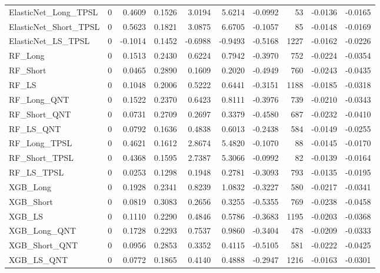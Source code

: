 \begin{tabular}{llrrrrrrrr}
\cline{1-10}
ElasticNet\_Long\_TPSL & 0 & 0.4609 & 0.1526 & 3.0194 & 5.6214 & -0.0992 & 53 & -0.0136 & -0.0165 \\
\cline{1-10}
ElasticNet\_Short\_TPSL & 0 & 0.5623 & 0.1821 & 3.0875 & 6.6705 & -0.1057 & 85 & -0.0148 & -0.0169 \\
\cline{1-10}
ElasticNet\_LS\_TPSL & 0 & -0.1014 & 0.1452 & -0.6988 & -0.9493 & -0.5168 & 1227 & -0.0162 & -0.0226 \\
\cline{1-10}
RF\_Long & 0 & 0.1513 & 0.2430 & 0.6224 & 0.7942 & -0.3970 & 752 & -0.0224 & -0.0354 \\
\cline{1-10}
RF\_Short & 0 & 0.0465 & 0.2890 & 0.1609 & 0.2020 & -0.4949 & 760 & -0.0243 & -0.0435 \\
\cline{1-10}
RF\_LS & 0 & 0.1048 & 0.2006 & 0.5222 & 0.6441 & -0.3151 & 1188 & -0.0185 & -0.0318 \\
\cline{1-10}
RF\_Long\_QNT & 0 & 0.1522 & 0.2370 & 0.6423 & 0.8111 & -0.3976 & 739 & -0.0210 & -0.0343 \\
\cline{1-10}
RF\_Short\_QNT & 0 & 0.0731 & 0.2709 & 0.2697 & 0.3379 & -0.4580 & 687 & -0.0232 & -0.0410 \\
\cline{1-10}
RF\_LS\_QNT & 0 & 0.0792 & 0.1636 & 0.4838 & 0.6013 & -0.2438 & 584 & -0.0149 & -0.0255 \\
\cline{1-10}
RF\_Long\_TPSL & 0 & 0.4621 & 0.1612 & 2.8674 & 5.4820 & -0.1070 & 88 & -0.0145 & -0.0170 \\
\cline{1-10}
RF\_Short\_TPSL & 0 & 0.4368 & 0.1595 & 2.7387 & 5.3066 & -0.0992 & 82 & -0.0139 & -0.0164 \\
\cline{1-10}
RF\_LS\_TPSL & 0 & 0.0253 & 0.1298 & 0.1948 & 0.2781 & -0.3093 & 793 & -0.0135 & -0.0195 \\
\cline{1-10}
XGB\_Long & 0 & 0.1928 & 0.2341 & 0.8239 & 1.0832 & -0.3227 & 580 & -0.0217 & -0.0341 \\
\cline{1-10}
XGB\_Short & 0 & 0.0819 & 0.3083 & 0.2656 & 0.3255 & -0.5355 & 769 & -0.0238 & -0.0458 \\
\cline{1-10}
XGB\_LS & 0 & 0.1110 & 0.2290 & 0.4846 & 0.5786 & -0.3683 & 1195 & -0.0203 & -0.0368 \\
\cline{1-10}
XGB\_Long\_QNT & 0 & 0.1728 & 0.2293 & 0.7537 & 0.9860 & -0.3404 & 478 & -0.0209 & -0.0333 \\
\cline{1-10}
XGB\_Short\_QNT & 0 & 0.0956 & 0.2853 & 0.3352 & 0.4115 & -0.5105 & 581 & -0.0222 & -0.0425 \\
\cline{1-10}
XGB\_LS\_QNT & 0 & 0.0772 & 0.1865 & 0.4140 & 0.4888 & -0.2947 & 1216 & -0.0163 & -0.0301 \\

\end{tabular}
